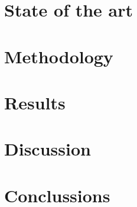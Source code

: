 \documentclass{article}
\begin{document}
\section{State of the art}
\section {Methodology}
\section{Results}
\section{Discussion}
\section{Conclussions}


\newpage
  

\end{document}
